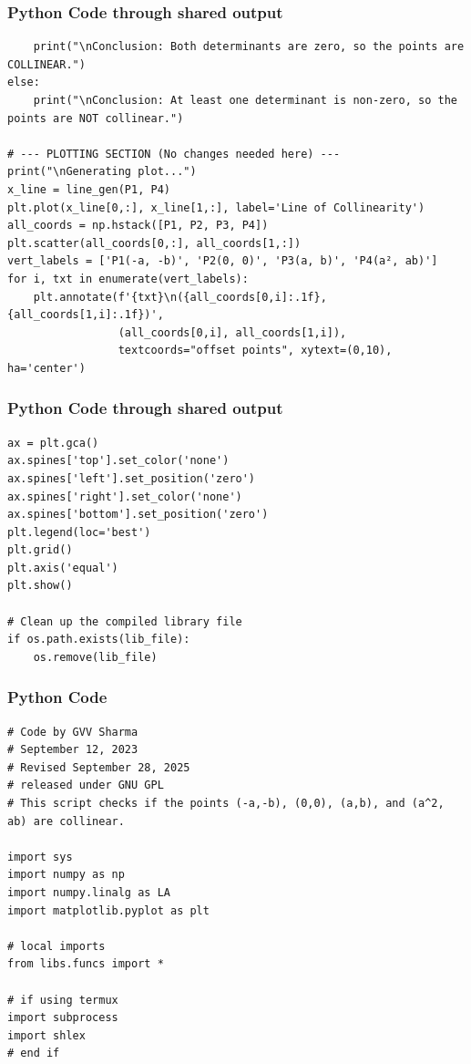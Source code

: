 \documentclass{beamer}
\begin{document}
\begin{frame}[fragile]
\frametitle{Python Code through shared output}
\begin{lstlisting}
    print("\nConclusion: Both determinants are zero, so the points are COLLINEAR.")
else:
    print("\nConclusion: At least one determinant is non-zero, so the points are NOT collinear.")

# --- PLOTTING SECTION (No changes needed here) ---
print("\nGenerating plot...")
x_line = line_gen(P1, P4)
plt.plot(x_line[0,:], x_line[1,:], label='Line of Collinearity')
all_coords = np.hstack([P1, P2, P3, P4])
plt.scatter(all_coords[0,:], all_coords[1,:])
vert_labels = ['P1(-a, -b)', 'P2(0, 0)', 'P3(a, b)', 'P4(a², ab)']
for i, txt in enumerate(vert_labels):
    plt.annotate(f'{txt}\n({all_coords[0,i]:.1f}, {all_coords[1,i]:.1f})',
                 (all_coords[0,i], all_coords[1,i]),
                 textcoords="offset points", xytext=(0,10), ha='center')
\end{lstlisting}
\end{frame}
\begin{frame}[fragile]
\frametitle{Python Code through shared output}
\begin{lstlisting}
ax = plt.gca()
ax.spines['top'].set_color('none')
ax.spines['left'].set_position('zero')
ax.spines['right'].set_color('none')
ax.spines['bottom'].set_position('zero')
plt.legend(loc='best')
plt.grid()
plt.axis('equal')
plt.show()

# Clean up the compiled library file
if os.path.exists(lib_file):
    os.remove(lib_file)
\end{lstlisting}
\end{frame}
\begin{frame}[fragile]
\frametitle{Python Code}
\begin{lstlisting}
# Code by GVV Sharma
# September 12, 2023
# Revised September 28, 2025
# released under GNU GPL
# This script checks if the points (-a,-b), (0,0), (a,b), and (a^2, ab) are collinear.

import sys                                        
import numpy as np
import numpy.linalg as LA
import matplotlib.pyplot as plt

# local imports
from libs.funcs import *

# if using termux
import subprocess
import shlex
# end if
\end{lstlisting}
\end{frame}
\end{document}
